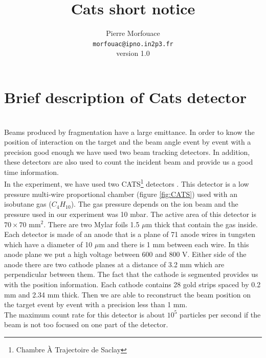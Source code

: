 \documentclass[a4paper,12pt]{article}
\begin{document}
\title{\textbf{Cats short notice}}
\author{Pierre Morfouace\\
        \texttt{morfouac@ipno.in2p3.fr}\\
        version 1.0
}
\maketitle 

\tableofcontents
\pagebreak


\section{Brief description of Cats detector}
~\\
\indent Beams produced by fragmentation have a large emittance. In order to know the position of interaction on the target and the beam angle event by event with a precision good enough we have used two beam tracking detectors. In addition, these detectors are also used to count the incident beam and provide us a good time information.\\
In the experiment, we have used two CATS\footnote{Chambre \`A Trajectoire de Saclay} detectors \cite{Ott}. This detector is a low pressure multi-wire proportional chamber (figure \ref{fig:CATS}) used with an isobutane gas ($C_4H_{10}$). The gas pressure depends on the ion beam and the pressure used in our experiment was 10 mbar. The active area of this detector is $70 \times 70$ mm$^2$. There are two Mylar foils 1.5 $\mu$m thick that contain the gas inside. Each detector is made of an anode that is a plane of 71 anode wires in tungsten which have a diameter of 10 $\mu$m and there is 1 mm between each wire. In this anode plane we put a high voltage between 600 and 800 V. Either side of the anode there are two cathode planes at a distance of 3.2 mm which are perpendicular between them. The fact that the cathode is segmented provides us with the position information. Each cathode contains 28 gold strips spaced by 0.2 mm and 2.34 mm thick. Then we are able to reconstruct the beam position on the target event by event with a precision less than 1 mm.\\
The maximum count rate for this detector is about $10^5$ particles per second if the beam is not too focused on one part of the detector.
\end{document}
